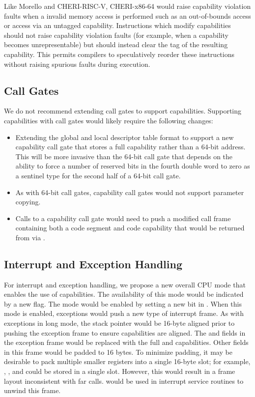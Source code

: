 Like Morello and CHERI-RISC-V, CHERI-x86-64 would
raise capability violation faults when a invalid memory access is
performed such as an out-of-bounds access or access via an untagged
capability.  Instructions which modify
capabilities should not raise capability violation faults (for
example, when a capability becomes unrepresentable) but should instead
clear the tag of the resulting capability.  This permits compilers to
speculatively reorder these instructions without raising spurious
faults during execution.

\subsection{Call Gates}

We do not recommend extending call gates to support capabilities.
Supporting capabilities with call gates would likely require the
following changes:

\begin{itemize}
  \item Extending the global and local descriptor table format to
    support a new capability call gate that stores a full capability
    rather than a 64-bit address.  This will be more invasive than the
    64-bit call gate that depends on the ability to force a number
    of reserved bits in the fourth double word to zero as a sentinel
    type for the second half of a 64-bit call gate.

  \item As with 64-bit call gates, capability call gates would not support
    parameter copying.

  \item Calls to a capability call gate would need to push a modified
    call frame containing both a code segment and code capability that
    would be returned from via .
\end{itemize}

\subsection{Interrupt and Exception Handling}
\label{sec:x86:interrupt-exception}

For interrupt and exception handling, we propose a new overall CPU
mode that enables the use of capabilities.  The availability of this
mode would be indicated by a new  flag.  The mode
would be enabled by setting a new bit in \CRFOUR{}.  When this mode is
enabled, exceptions would push a new type of interrupt frame.  As with
exceptions in long mode, the stack pointer would be 16-byte aligned
prior to pushing the exception frame to ensure capabilities are
aligned.  The \RIP{} and \RSP{} fields in the exception frame would be
replaced with the full \CIP{} and \CSP{} capabilities.  Other fields
in this frame would be padded to 16 bytes.  To minimize padding, it
may be desirable to pack multiple smaller registers into a single
16-byte slot; for example, \SSreg{}, \CS{}, and \RFLAGS{} could be stored
in a single slot.  However, this would result in a frame layout
inconsistent with far calls.   would be used in
interrupt service routines to unwind this frame.

